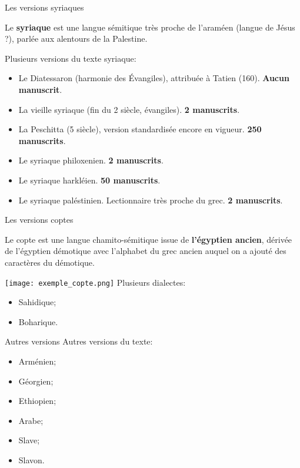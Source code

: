 \documentclass[11pt]{beamer}
\begin{document}
\begin{frame}{Les versions syriaques}
    \begin{alertblock}{}
    Le \textbf{syriaque} est une langue sémitique très proche de l'araméen (langue de Jésus ?), parlée aux alentours de la Palestine.
    \end{alertblock}
    \pause
    
    Plusieurs versions du texte syriaque:
    \begin{itemize}
        \item Le Diatessaron (harmonie des Évangiles), attribuée à Tatien (160). \textbf{Aucun manuscrit}.
        \item La vieille syriaque (fin du 2\ieme{} siècle, évangiles). \textbf{2 manuscrits}.
        \item La Peschitta (5\ieme{} siècle), version standardisée encore en vigueur. \textbf{250 manuscrits}.
        \item Le syriaque philoxenien. \textbf{2 manuscrits}.
        \item Le syriaque harkléien. \textbf{50 manuscrits}.
        \item Le syriaque paléstinien. Lectionnaire très proche du grec. \textbf{2 manuscrits}.
    \end{itemize}
\end{frame}

\begin{frame}{Les versions coptes}
\begin{alertblock}{}
    Le copte est une langue chamito-sémitique issue de \textbf{l'égyptien ancien}, dérivée de l'égyptien démotique avec l'alphabet du grec ancien auquel on a ajouté des caractères du démotique.
\end{alertblock}
\centering
    \texttt{[image: exemple\_copte.png]}
\flushleft
Plusieurs dialectes:
\begin{itemize}
    \item Sahidique;
    \item Boharique.
\end{itemize}
\end{frame}

\begin{frame}{Autres versions}
Autres versions du texte:
    \begin{itemize}
        \item Arménien;
        \item Géorgien;
        \item Ethiopien;
        \item Arabe;
        \item Slave;
        \item Slavon.
    \end{itemize}
\end{frame}
\end{document}
